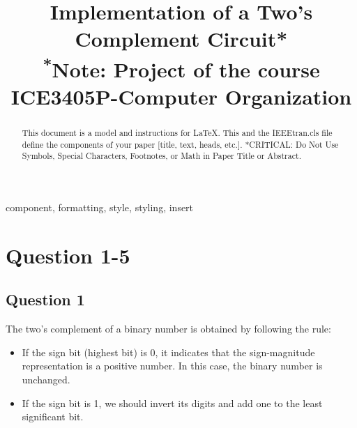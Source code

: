 \documentclass[conference]{IEEEtran}
\begin{document}
\title{Implementation of a Two's Complement Circuit*\\
{\footnotesize \textsuperscript{*}Note: Project of the course ICE3405P-Computer Organization}
}

\author{
\and
{}
}

\maketitle

\begin{abstract}
This document is a model and instructions for \LaTeX.
This and the IEEEtran.cls file define the components of your paper [title, text, heads, etc.]. *CRITICAL: Do Not Use Symbols, Special Characters, Footnotes, 
or Math in Paper Title or Abstract.
\end{abstract}

\begin{IEEEkeywords}
component, formatting, style, styling, insert
\end{IEEEkeywords}


\section{Question 1-5}

\subsection{Question 1}\label{sec:q_A}

The two's complement of a binary number is obtained by following the rule:
\begin{itemize}
    \item If the sign bit (highest bit) is 0, it indicates that the sign-magnitude representation is a positive number. In this case, the binary number is unchanged.
    \item If the sign bit is 1, we should invert its digits and add one to the least significant bit. 
\end{itemize}
\end{document}
